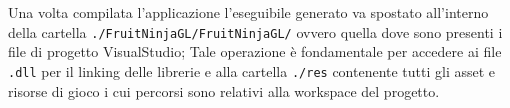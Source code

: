 Una volta compilata l'applicazione l'eseguibile generato va spostato all'{}interno della cartella \texttt{./FruitNinjaGL/FruitNinjaGL/} ovvero quella dove sono presenti i file di progetto VisualStudio; Tale operazione è fondamentale per accedere ai file \texttt{.dll} per il linking delle librerie e alla cartella \texttt{./res} contenente tutti gli asset e risorse di gioco i cui percorsi sono relativi alla workspace del progetto.





















































%
















